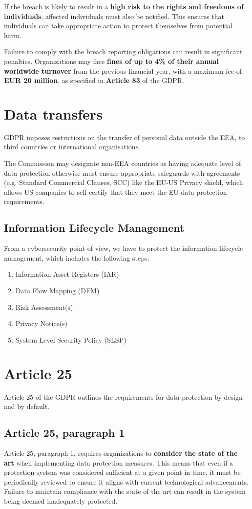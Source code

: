 If the breach is likely to result in a \textbf{high risk to the rights
and freedoms of individuals}, affected individuals must also be
notified. This ensures that individuals can take appropriate action to
protect themselves from potential harm.  

Failure to comply with the breach reporting obligations can result in
significant penalties. Organizations may face \textbf{fines of up to
4\% of their annual worldwide turnover} from the previous financial
year, with a maximum fee of \textbf{EUR 20 million}, as specified in
\textbf{Article 83} of the GDPR.  

\section{Data transfers}
GDPR imposes restrictions on the transfer of personal data outside the
EEA, to third countries or international organisations.

The Commission may designate non-EEA countries as having adequate
level of data protection otherwise must ensure appropriate safeguards
with agreements (e.g. Standard Commercial Clauses, SCC) like the EU-US
Privacy shield, which allows US companies to self-certify that they 
meet the EU data protection requirements.

\subsection{Information Lifecycle Management}
From a cybersecurity point of view, we have to protect the information
lifecycle management, which includes the following steps:
\begin{enumerate}
  \item Information Asset Registers (IAR)
  \item Data Flow Mapping (DFM)
  \item Risk Assessment(s)
  \item Privacy Notice(s)
  \item System Level Security Policy (SLSP)
\end{enumerate}

\section{Article 25}
Article 25 of the GDPR outlines the requirements for data protection 
by design and by default.

\subsection{Article 25, paragraph 1}
Article 25, paragraph 1, requires organizations to \textbf{consider
the state of the art} when implementing data protection measures. This
means that even if a protection system was considered sufficient at a
given point in time, it must be periodically reviewed to ensure it
aligns with current technological advancements. Failure to maintain
compliance with the state of the art can result in the system being
deemed inadequately protected.

